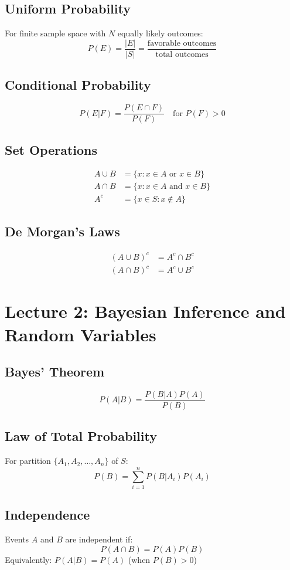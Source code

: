 \documentclass[10pt, twocolumn]{article}
\begin{document}
\subsection{Uniform Probability}
For finite sample space with $N$ equally likely outcomes:
\[ P(E) = \frac{|E|}{|S|} = \frac{\text{favorable outcomes}}{\text{total outcomes}} \]

\subsection{Conditional Probability}
\[ P(E|F) = \frac{P(E \cap F)}{P(F)} \quad \text{for } P(F) > 0 \]

\subsection{Set Operations}
\begin{align}
    A \cup B & = \{x : x \in A \text{ or } x \in B\}  \\
    A \cap B & = \{x : x \in A \text{ and } x \in B\} \\
    A^c      & = \{x \in S : x \notin A\}
\end{align}

\subsection{De Morgan's Laws}
\begin{align}
    (A \cup B)^c & = A^c \cap B^c \\
    (A \cap B)^c & = A^c \cup B^c
\end{align}

\section{Lecture 2: Bayesian Inference and Random Variables}

\subsection{Bayes' Theorem}
\[ P(A|B) = \frac{P(B|A) P(A)}{P(B)} \]

\subsection{Law of Total Probability}
For partition $\{A_1, A_2, \ldots, A_n\}$ of $S$:
\[ P(B) = \sum_{i=1}^{n} P(B|A_i) P(A_i) \]

\subsection{Independence}
Events $A$ and $B$ are independent if:
\[ P(A \cap B) = P(A) P(B) \]
Equivalently: $P(A|B) = P(A)$ (when $P(B) > 0$)
\end{document}
